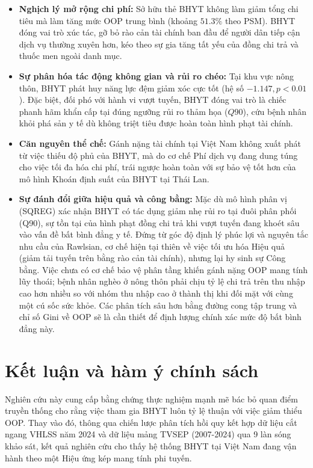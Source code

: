 \documentclass[12pt,a4paper]{article}
\begin{document}
\begin{itemize}
	\item \textbf{Nghịch lý mở rộng chi phí:} Sở hữu thẻ BHYT không làm giảm tổng chi tiêu mà làm tăng mức OOP trung bình (khoảng $51.3\%$ theo PSM). BHYT đóng vai trò xúc tác, gỡ bỏ rào cản tài chính ban đầu để người dân tiếp cận dịch vụ thường xuyên hơn, kéo theo sự gia tăng tất yếu của đồng chi trả và thuốc men ngoài danh mục.
	
	\item \textbf{Sự phân hóa tác động không gian và rủi ro chéo:} Tại khu vực nông thôn, BHYT phát huy năng lực đệm giảm xóc cực tốt (hệ số $-1.147, p < 0.01$). Đặc biệt, đối phó với hành vi vượt tuyến, BHYT đóng vai trò là chiếc phanh hãm khẩn cấp tại đúng ngưỡng rủi ro thảm họa ($Q90$), cứu bệnh nhân khỏi phá sản y tế dù không triệt tiêu được hoàn toàn hình phạt tài chính.
	
	\item \textbf{Căn nguyên thể chế:} Gánh nặng tài chính tại Việt Nam không xuất phát từ việc thiếu độ phủ của BHYT, mà do cơ chế Phí dịch vụ đang dung túng cho việc tối đa hóa chi phí, trái ngược hoàn toàn với sự bảo vệ tốt hơn của mô hình Khoán định suất của BHYT tại Thái Lan.
	
	\item \textbf{Sự đánh đổi giữa hiệu quả và công bằng:} Mặc dù mô hình phân vị (SQREG) xác nhận BHYT có tác dụng giảm nhẹ rủi ro tại đuôi phân phối (Q90), sự tồn tại của hình phạt đồng chi trả khi vượt tuyến đang khoét sâu vào vấn đề bất bình đẳng y tế. Đứng từ góc độ định lý phúc lợi và nguyên tắc nhu cầu của Rawlsian, cơ chế hiện tại thiên về việc tối ưu hóa Hiệu quả (giảm tải tuyến trên bằng rào cản tài chính), nhưng lại hy sinh sự Công bằng. Việc chưa có cơ chế bảo vệ phân tầng khiến gánh nặng OOP mang tính lũy thoái; bệnh nhân nghèo ở nông thôn phải chịu tỷ lệ chi trả trên thu nhập cao hơn nhiều so với nhóm thu nhập cao ở thành thị khi đối mặt với cùng một cú sốc sức khỏe. Các phân tích sâu hơn bằng đường cong tập trung và chỉ số Gini về OOP sẽ là cần thiết để định lượng chính xác mức độ bất bình đẳng này.
\end{itemize}

\clearpage
\section{Kết luận và hàm ý chính sách}

Nghiên cứu này cung cấp bằng chứng thực nghiệm mạnh mẽ bác bỏ quan điểm truyền thống cho rằng việc tham gia BHYT luôn tỷ lệ thuận với việc giảm thiểu OOP. 
Thay vào đó, thông qua chiến lược phân tích hồi quy kết hợp dữ liệu cắt ngang VHLSS năm 2024 và dữ liệu mảng TVSEP (2007-2024) qua 9 làn sóng khảo sát, kết quả nghiên cứu cho thấy hệ thống BHYT tại Việt Nam đang vận hành theo một Hiệu ứng kép mang tính phi tuyến. 
\end{document}

